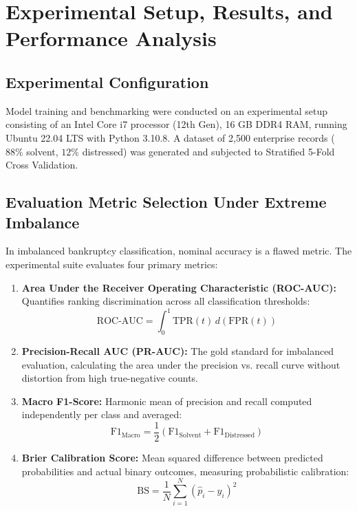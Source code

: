 \documentclass[11pt, a4paper]{article}
\begin{document}
\section{Experimental Setup, Results, and Performance Analysis}

\subsection{Experimental Configuration}
Model training and benchmarking were conducted on an experimental setup consisting of an Intel Core i7 processor (12th Gen), 16 GB DDR4 RAM, running Ubuntu 22.04 LTS with Python 3.10.8. A dataset of 2,500 enterprise records ($88\%$ solvent, $12\%$ distressed) was generated and subjected to Stratified 5-Fold Cross Validation.

\subsection{Evaluation Metric Selection Under Extreme Imbalance}
In imbalanced bankruptcy classification, nominal accuracy is a flawed metric. The experimental suite evaluates four primary metrics:
\begin{enumerate}
    \item \textbf{Area Under the Receiver Operating Characteristic (ROC-AUC):} Quantifies ranking discrimination across all classification thresholds:
    \begin{equation}
        \text{ROC-AUC} = \int_0^1 \text{TPR}(t) \, d(\text{FPR}(t))
    \end{equation}
    \item \textbf{Precision-Recall AUC (PR-AUC):} The gold standard for imbalanced evaluation, calculating the area under the precision vs. recall curve without distortion from high true-negative counts.
    \item \textbf{Macro F1-Score:} Harmonic mean of precision and recall computed independently per class and averaged:
    \begin{equation}
        \text{F1}_{\text{Macro}} = \frac{1}{2}\left( \text{F1}_{\text{Solvent}} + \text{F1}_{\text{Distressed}} \right)
    \end{equation}
    \item \textbf{Brier Calibration Score:} Mean squared difference between predicted probabilities and actual binary outcomes, measuring probabilistic calibration:
    \begin{equation}
        \text{BS} = \frac{1}{N}\sum_{i=1}^N \left( \hat{p}_i - y_i \right)^2
    \end{equation}
\end{enumerate}
\end{document}

